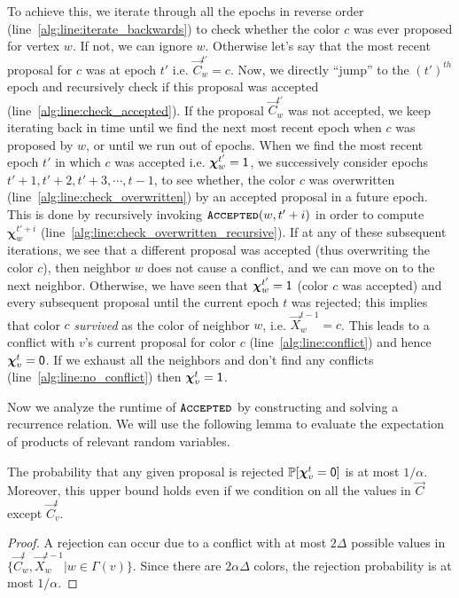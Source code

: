 To achieve this, we iterate through all the epochs in reverse order (line~\ref{alg:line:iterate_backwards})
to check whether the color $c$ was ever proposed for vertex $w$.
If not, we can ignore $w$.
Otherwise let's say that the most recent proposal for $c$ was at epoch $t'$ i.e. $\vec C^{t'}_w = c$.
Now, we directly ``jump'' to the $(t')^{th}$ epoch and recursively check if this proposal was accepted (line~\ref{alg:line:check_accepted}).
If the proposal $\vec C^{t'}_w$ was not accepted, we keep iterating back in time until we find the next most recent epoch
when $c$ was proposed by $w$, or until we run out of epochs.
When we find the most recent epoch $t'$ in which $c$ was accepted i.e. $\bm\chi^{t'}_w = \mathsf{1}$,
we successively consider epochs $t'+1, t'+2, t'+3, \cdots, t-1$, to see whether,
the color $c$ was overwritten (line~\ref{alg:line:check_overwritten}) by an accepted proposal in a future epoch.
This is done by recursively invoking $\texttt{\textsc{Accepted}}(w,t'+i)$ in order to compute $\bm\chi^{t'+i}_w$ (line~\ref{alg:line:check_overwritten_recursive}).
If at any of these subsequent iterations, we see that a different proposal was accepted (thus overwriting the color $c$),
then neighbor $w$ does not cause a conflict, and we can move on to the next neighbor.
Otherwise, we have seen that $\bm\chi^{t'}_w = \mathsf{1}$ (color $c$ was accepted) and every subsequent proposal until the current epoch $t$ was rejected;
this implies that color $c$ \emph{survived} as the color of neighbor $w$, i.e. $\vec X^{t-1}_w = c$.
This leads to a conflict with $v$'s current proposal for color $c$ (line~\ref{alg:line:conflict}) and hence $\bm\chi^t_v = \mathsf{0}$.
If we exhaust all the neighbors and don't find any conflicts (line~\ref{alg:line:no_conflict}) then $\bm\chi^t_v = \mathsf{1}$.

Now we analyze the runtime of $\texttt{\textsc{Accepted}}$ by constructing and solving a recurrence relation.
We will use the following lemma to evaluate the expectation of products of relevant random variables.

\begin{lemma}
\label{lem:color_reject_probability}
The probability that any given proposal is rejected $\mathbb P[\bm\chi^t_v=\mathsf{0}]$ is at most $1/\alpha$.
Moreover, this upper bound holds even if we condition on all the values in $\vec C$ except $\vec C^t_v$.
\end{lemma}
\begin{proof}
A rejection can occur due to a conflict with at most $2\Delta$ possible values in $\{\vec C^t_w, \vec X^{t-1}_w | w\in\Gamma(v)\}$.
Since there are $2\alpha\Delta$ colors, the rejection probability is at most $1/\alpha$.
\end{proof}


